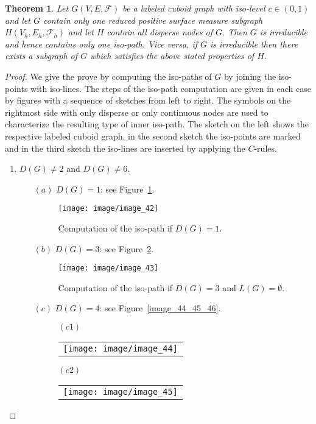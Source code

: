 \documentclass[a4paper,11pt]{article}
\newtheorem{theorem}{Theorem}[section]
\begin{document}
\begin{theorem}\label{thm:class-3}
Let $G(V,E,\mathcal{F})$ be a labeled cuboid graph with iso-level $c\in (0,1)$ and let $G$ contain
only one reduced positive surface measure subgraph $H(V_h,E_h,\mathcal{F}_h)$ and let $H$ contain
all disperse nodes of $G$. Then $G$ is irreducible and hence contains only one iso-path. Vice versa,
if $G$ is irreducible then there exists a subgraph of $G$ which satisfies the above stated properties
of $H$.
\end{theorem}

\begin{proof} We give the prove by computing the iso-paths of $G$ by joining the iso-points with iso-lines.
The steps of the iso-path computation are given in each case by figures with a sequence of sketches from
left to right. The symbols on the rightmost side with only disperse or only continuous nodes are used
to characterize the resulting type of inner iso-path. The sketch on the left shows the respective
labeled cuboid graph, in the second sketch the iso-points are marked and in the third sketch the iso-lines
are inserted by applying the $C$-rules.
\begin{enumerate}
\item $D(G)\neq 2$ and $D(G)\neq 6$.
\begin{itemize}
\item[$(a)$] $D(G)=1$: see Figure~\ref{image_42}.
\begin{figure}[!ht]
\texttt{[image: image/image\_42]}
\caption{Computation of the iso-path if $D(G)=1$.}
\label{image_42}
\end{figure}
\FloatBarrier
\item[$(b)$] $D(G)=3$: see Figure~\ref{image_43}.
\begin{figure}[!ht]
\texttt{[image: image/image\_43]}
\caption{Computation of the iso-path if $D(G)=3$ and $L(G)=\emptyset$.}
\label{image_43}
\end{figure}
\FloatBarrier
\item[$(c)$] $D(G)=4$: see Figure~\ref{image_44_45_46}.
\begin{figure}[!ht]
$(c1)$
\begin{tabular}[c]{l}
\texttt{[image: image/image\_44]}
\end{tabular}

\vspace{0.2cm}
$(c2)$
\begin{tabular}[c]{l}
\texttt{[image: image/image\_45]}
\end{tabular}


\end{figure}
\end{itemize}
\end{enumerate}
\end{proof}
\end{document}
